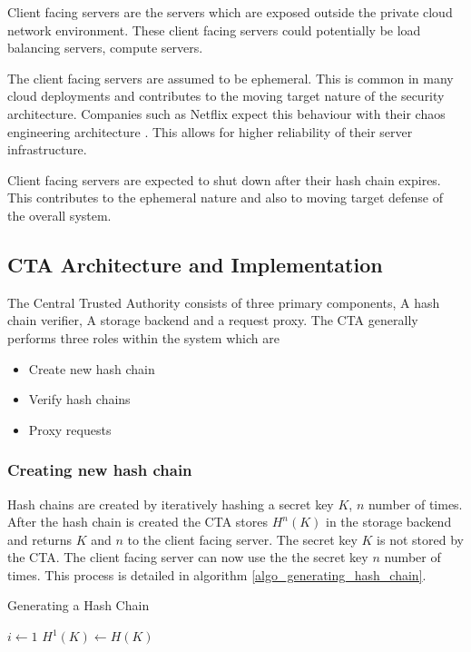 \documentclass{sig-alternate-05-2015}
\begin{document}
Client facing servers are the servers which are exposed outside the private cloud network environment. These client facing servers could potentially be load balancing servers, compute servers.

The client facing servers are assumed to be ephemeral. This is common in many cloud deployments \cite{vaquero_dynamically_2011} and contributes to the moving target nature of the security architecture. Companies such as Netflix expect this behaviour with their chaos engineering architecture \cite{basiri_chaos_2016}. This allows for higher reliability of their server infrastructure.

Client facing servers are expected to shut down after their hash chain expires. This contributes to the ephemeral nature and also to moving target defense of the overall system.

\subsection{CTA Architecture and Implementation}

The Central Trusted Authority consists of three primary components, A hash chain verifier, A storage backend and a request proxy. The CTA generally performs three roles within the system which are

\begin{itemize}
\item Create new hash chain
\item Verify hash chains
\item Proxy requests
\end{itemize}

\subsubsection{Creating new hash chain}
Hash chains are created by iteratively hashing a secret key $K$, $n$ number of times. 
After the hash chain is created the CTA stores $H^{n}(K)$ in the storage backend and returns $K$ and $n$ to the client facing server. The secret key $K$ is not stored by the CTA. The client facing server can now use the the secret key $n$ number of times. This process is detailed in algorithm  \ref{algo_generating_hash_chain}.

\begin{algorithm}
\SetAlgoLined
\caption{Generating a Hash Chain}
\label{algo_generating_hash_chain}
\LinesNumbered
{}
$i \leftarrow 1 $\;
$H^{1}(K) \leftarrow H(K)$ \;
 \;
\end{algorithm}
\end{document}

